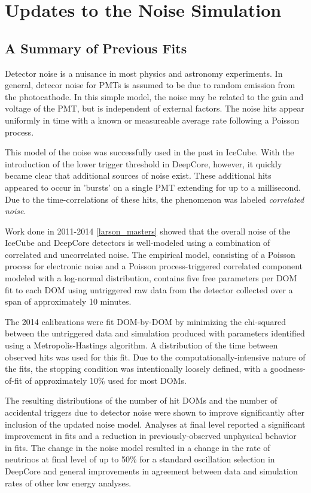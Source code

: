 \chapter{Updates to the Noise Simulation}

\label{sec:old_vuvuzela}
\section{A Summary of Previous Fits}
Detector noise is a nuisance in most physics and astronomy experiments. 
In general, detecor noise for PMTs is assumed to be due to random emission from the photocathode.
In this simple model, the noise may be related to the gain and voltage of the PMT, but is independent of external factors.
The noise hits appear uniformly in time with a known or measureable average rate following a Poisson process.

This model of the noise was successfully used in the past in IceCube. 
With the introduction of the lower trigger threshold in DeepCore, however, it quickly became clear that additional sources of noise exist.
These additional hits appeared to occur in 'bursts' on a single PMT extending for up to a millisecond.
Due to the time-correlations of these hits, the phenomenon was labeled \emph{correlated noise}.

Work done in 2011-2014 \ref{larson_masters} showed that the overall noise of the IceCube and DeepCore detectors is well-modeled using a combination of correlated and uncorrelated noise.
The empirical model, consisting of a Poisson process for electronic noise and a Poisson process-triggered correlated component modeled with a log-normal distribution, contains five free parameters per DOM fit to each DOM using untriggered raw data from the detector collected over a span of approximately 10 minutes.

The 2014 calibrations were fit DOM-by-DOM by minimizing the chi-squared between the untriggered data and simulation produced with parameters identified using a Metropolis-Hastings algorithm.
A distribution of the time between observed hits was used for this fit.
Due to the computationally-intensive nature of the fits, the stopping condition was intentionally loosely defined, with a goodness-of-fit of approximately 10\% used for most DOMs.

The resulting distributions of the number of hit DOMs and the number of accidental triggers due to detector noise were shown to improve significantly after inclusion of the updated noise model.
Analyses at final level reported a significant improvement in fits and a reduction in previously-observed unphysical behavior in fits.
The change in the noise model resulted in a change in the rate of neutrinos at final level of up to 50\% for a standard oscillation selection in DeepCore and general improvements in agreement between data and simulation rates of other low energy analyses.

